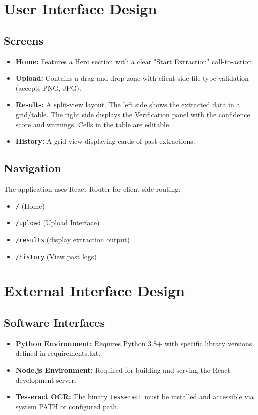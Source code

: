 \documentclass[12pt, a4paper]{article}
\begin{document}
\section{User Interface Design}

\subsection{Screens}
\begin{itemize}
    \item \textbf{Home:} Features a Hero section with a clear "Start Extraction" call-to-action.
    \item \textbf{Upload:} Contains a drag-and-drop zone with client-side file type validation (accepts PNG, JPG).
    \item \textbf{Results:} A split-view layout. The left side shows the extracted data in a grid/table. The right side displays the Verification panel with the confidence score and warnings. Cells in the table are editable.
    \item \textbf{History:} A grid view displaying cards of past extractions.
\end{itemize}

\subsection{Navigation}
The application uses React Router for client-side routing:
\begin{itemize}
    \item \texttt{/} (Home)
    \item \texttt{/upload} (Upload Interface)
    \item \texttt{/results} (display extraction output)
    \item \texttt{/history} (View past logs)
\end{itemize}

\section{External Interface Design}

\subsection{Software Interfaces}
\begin{itemize}
    \item \textbf{Python Environment:} Requires Python 3.8+ with specific library versions defined in requirements.txt.
    \item \textbf{Node.js Environment:} Required for building and serving the React development server.
    \item \textbf{Tesseract OCR:} The binary \texttt{tesseract} must be installed and accessible via system PATH or configured path.
\end{itemize}
\end{document}
